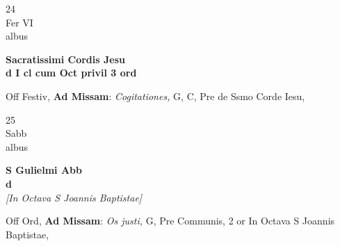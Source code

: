\documentclass[10pt, openany]{book}
\begin{document}
        \begin{center}
            \begin{minipage}{3.5in}
                \vspace{2em}
                \begin{minipage}{0.5in}
                    {\Huge 24} \\
                    {\normalsize Fer VI} \\
                    {\normalsize albus}
                \end{minipage}
                \begin{minipage}{3.0in}
                    \textbf{ \large Sacratissimi Cordis Jesu \\
                    \textnormal{\normalsize d I cl cum Oct privil 3 ord}} \\ 
                \end{minipage}
                \begin{justify}Off Festiv, \textbf{Ad Missam}: \textit{Cogitationes,} G, C, Pre de Ssmo Corde Iesu,  
                \end{justify}
            \end{minipage}
        \end{center}
    
        \begin{center}
            \begin{minipage}{3.5in}
                \vspace{2em}
                \begin{minipage}{0.5in}
                    {\Huge 25} \\
                    {\normalsize Sabb} \\
                    {\normalsize albus}
                \end{minipage}
                \begin{minipage}{3.0in}
                    \textbf{ \large S Gulielmi Abb \\
                    \textnormal{\normalsize d}} \\ \textit{[In Octava S Joannis Baptistae]} \\ 
                \end{minipage}
                \begin{justify}Off Ord, \textbf{Ad Missam}: \textit{Os justi,} G, Pre Communis, 2 or In Octava S Joannis Baptistae,  
                \end{justify}
            \end{minipage}
        \end{center}
    
\end{document}
